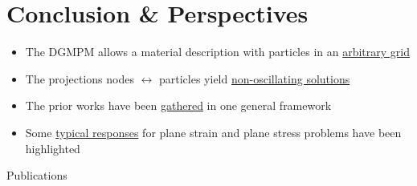 \documentclass[11pt,aspectratio=1610]{beamer}
\begin{document}
\section*{Conclusion \& Perspectives}

\frame[plain,]{\sectionpage}
\setcounter{section}{0}

\begin{frame}[standout]{}
  \begin{footnotesize}
    \begin{block}{}
      \begin{itemize}
      \item[] The DGMPM allows a material description with particles in an \underline{arbitrary grid} 
      \item[] The projections nodes $\leftrightarrow$ particles yield \underline{non-oscillating solutions}
      \end{itemize}

  \end{block}

  \begin{block}{}
    \begin{itemize}
    \item[] The prior works have been \underline{gathered} in one general framework
    \item[] Some \underline{typical responses} for plane strain and plane stress problems have been highlighted
    \end{itemize}
  \end{block}\pause
  \begin{block}{Publications}
    \begin{scriptsize}
      \\
      \vspace{0.25cm}
    \end{scriptsize}
  \end{block}

  \end{footnotesize}
\end{frame}
\end{document}
